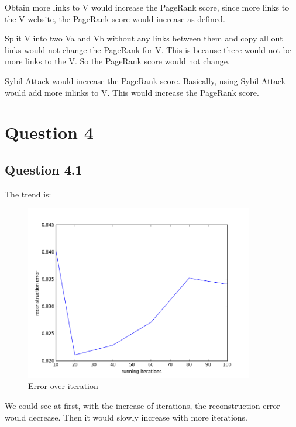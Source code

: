 \documentclass{article} %
\begin{document}
Obtain more links to V would increase the PageRank score, since more links to
the V website, the PageRank score would increase as defined.

Split V into two Va and Vb without any links between them and copy all out
links would not change the PageRank for V. This is because there would not be
more links to the V. So the PageRank score would not change.

Sybil Attack would increase the PageRank score. Basically, using Sybil Attack
would add more inlinks to V. This would increase the PageRank score.


\section{Question 4}


\subsection{Question 4.1}
The trend is:
\begin{figure}[h]
\begin{center}
\includegraphics[width=10cm]{pic/q41.png}
\end{center}
\caption{Error over iteration}
\end{figure}

We could see at first, with the increase of iterations, the reconstruction error
would decrease. Then it would slowly increase with more iterations.
\end{document}
